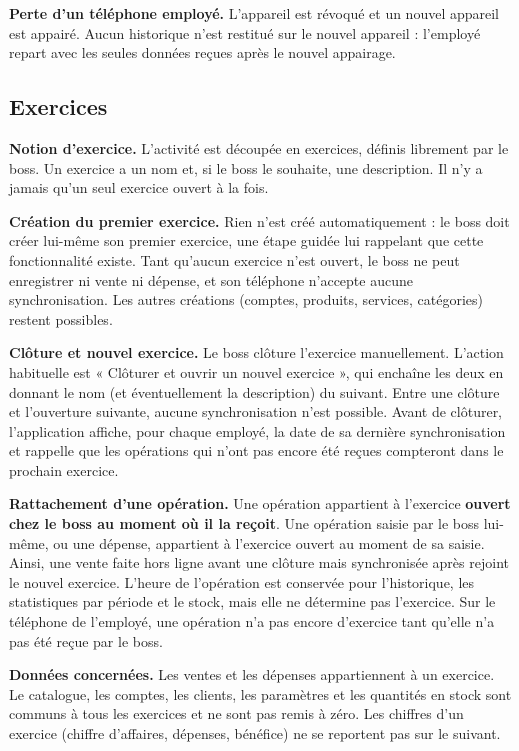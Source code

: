 \documentclass[11pt,a4paper]{article}
\newcommand{\fonc}[2]{\textbf{#1.} #2\par\vspace{0.2em}}
\begin{document}
	\fonc{Perte d'un téléphone employé}{L'appareil est révoqué et un nouvel appareil est appairé. Aucun historique n'est restitué sur le nouvel appareil : l'employé repart avec les seules données reçues après le nouvel appairage.}

	\subsection{Exercices}

	\fonc{Notion d'exercice}{L'activité est découpée en exercices, définis librement par le boss. Un exercice a un nom et, si le boss le souhaite, une description. Il n'y a jamais qu'un seul exercice ouvert à la fois.}

	\fonc{Création du premier exercice}{Rien n'est créé automatiquement : le boss doit créer lui-même son premier exercice, une étape guidée lui rappelant que cette fonctionnalité existe. Tant qu'aucun exercice n'est ouvert, le boss ne peut enregistrer ni vente ni dépense, et son téléphone n'accepte aucune synchronisation. Les autres créations (comptes, produits, services, catégories) restent possibles.}

	\fonc{Clôture et nouvel exercice}{Le boss clôture l'exercice manuellement. L'action habituelle est « Clôturer et ouvrir un nouvel exercice », qui enchaîne les deux en donnant le nom (et éventuellement la description) du suivant. Entre une clôture et l'ouverture suivante, aucune synchronisation n'est possible. Avant de clôturer, l'application affiche, pour chaque employé, la date de sa dernière synchronisation et rappelle que les opérations qui n'ont pas encore été reçues compteront dans le prochain exercice.}

	\fonc{Rattachement d'une opération}{Une opération appartient à l'exercice \textbf{ouvert chez le boss au moment où il la reçoit}. Une opération saisie par le boss lui-même, ou une dépense, appartient à l'exercice ouvert au moment de sa saisie. Ainsi, une vente faite hors ligne avant une clôture mais synchronisée après rejoint le nouvel exercice. L'heure de l'opération est conservée pour l'historique, les statistiques par période et le stock, mais elle ne détermine pas l'exercice. Sur le téléphone de l'employé, une opération n'a pas encore d'exercice tant qu'elle n'a pas été reçue par le boss.}

	\fonc{Données concernées}{Les ventes et les dépenses appartiennent à un exercice. Le catalogue, les comptes, les clients, les paramètres et les quantités en stock sont communs à tous les exercices et ne sont pas remis à zéro. Les chiffres d'un exercice (chiffre d'affaires, dépenses, bénéfice) ne se reportent pas sur le suivant.}
\end{document}
